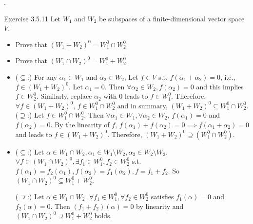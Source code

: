 \documentclass[8pt]{beamer}
\begin{document}
\begin{frame}{.}
    \begin{block}{Exercise 3.5.11}    
        Let $W_1$ and $W_2$ be subspaces of a finite-dimensional vector space $V$.
        \begin{itemize}
            \item Prove that $(W_1 + W_2)^0 = W_1^0 \cap W^0_2$
            \item Prove that $(W_1 \cap W_2)^0 = W_1^0 + W^0_2$
        \end{itemize}

        \begin{itemize}
            \item ($\subseteq$:) For any $\alpha_1 \in W_1$ and $\alpha_2 \in W_2$, Let $f \in V$ s.t. $f(\alpha_1 + \alpha_2) = 0$, i.e., $f \in (W_1 + W_2)^0$.
            Let $\alpha_1= 0$.
            Then $\forall \alpha_2 \in W_2, f(\alpha_2) = 0$ and this implies $f \in W^0_2$.
            Similarly, replace $\alpha_2$ with $0$ leads to $f \in W^0_1$.
            Therefore, $\forall f \in (W_1 + W_2)^0$, $f \in W_1^0 \cap W_2^0$ and in summary, $(W_1 + W_2)^0 \subseteq W_1^0 \cap W_2^0$.
            ($\supseteq$:) Let $f \in W_1^0 \cap W_2^0$.
            Then $\forall \alpha_1 \in W_1, \forall \alpha_2 \in W_2$, $f(\alpha_1) = 0$ and $f(\alpha_2) = 0$.
            By the linearity of $f$, $f(\alpha_1) + f(\alpha_2) = 0 \implies f(\alpha_1 + \alpha_2) = 0$ and leads to $f \in (W_1 + W_2)^0$.
            Therefore, $(W_1 + W_2)^0 \supseteq (W_1^0 \cap W_2^0)$.
            \item ($\subseteq$:) Let $\alpha \in W_1 \cap W_2, \alpha_1 \in W_1 \setminus W_2, \alpha_2 \in W_2 \setminus W_2$.
            $\forall f \in (W_1 \cap W_2)^0, \exists f_1 \in W_1^0, f_2 \in W_2^0$ s.t. $f(\alpha_1) = f_2(\alpha_1), f(\alpha_2) = f_1(\alpha_2), f = f_1 + f_2$.
            So $(W_1 \cap W_2)^0 \subseteq W_1^0 + W_2^0$.

            ($\supseteq$:) Let $\alpha \in W_1 \cap W_2$.
            $\forall f_1 \in W_1^0, \forall f_2 \in W_2^0$ satisfies $f_1(\alpha) = 0$ and $f_2(\alpha) = 0$.
            Then $(f_1 + f_2)(\alpha) = 0$ by linearity and $(W_1 \cap W_2)^0 \supseteq W_1^0 + W_2^0$ holds.
        \end{itemize}
    \end{block}

\end{frame}
\end{document}
